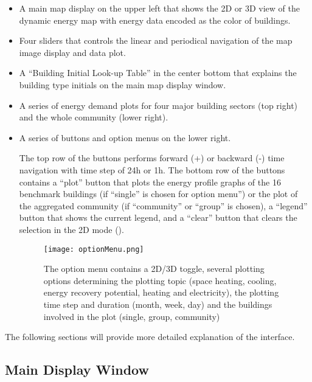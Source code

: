 \begin{itemize}
\item A main map display on the upper left that shows the 2D or 3D
  view of the dynamic energy map with energy data encoded as the color
  of buildings.

\item Four sliders that controls the linear and periodical navigation
  of the map image display and data plot.

\item A ``Building Initial Look-up Table'' in the center bottom that
  explains the building type initials on the main map display window.
\item A series of energy demand plots for four major building sectors
  (top right) and the whole community (lower right).  
\item A series of buttons and option menus on the lower right. 

  The top row of the buttons performs forward (+) or backward (-) time
  navigation with time step of 24h or 1h. The bottom row of the
  buttons contains a ``plot'' button that plots the energy profile
  graphs of the 16 benchmark buildings (if ``single'' is chosen for
  option menu'') or the plot of the aggregated community (if
  ``community'' or ``group'' is chosen), a ``legend'' button that
  shows the current legend, and a ``clear'' button that clears the
  selection in the 2D mode ().
  
  \begin{figure}[h!]
    \centering
    \texttt{[image: optionMenu.png]}
    \caption[Option Menu]{The option menu contains a 2D/3D toggle,
      several plotting options determining the plotting topic (space
      heating, cooling, energy recovery potential, heating and
      electricity), the plotting time step and duration (month, week,
      day) and the buildings involved in the plot (single, group, community)}
    \label{fig:optionMenu}
  \end{figure}

\end{itemize}

The following sections will provide more detailed explanation of the
interface.

\subsection {Main Display Window} \label{2d3d} 

